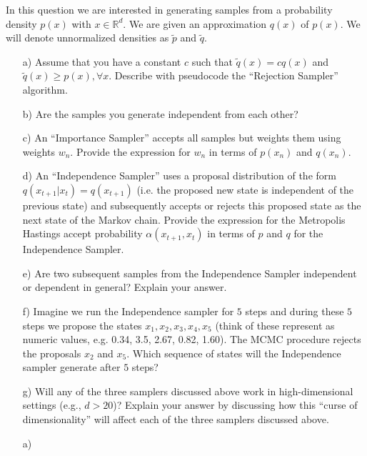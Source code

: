 \documentclass{amsmlaj}
\begin{document}
\begin{problem}
In this question we are interested in generating samples from a probability density $p(x)$ with $x\in\mathbb{R}^d$. We are given an approximation $q(x)$ of $p(x)$. We will denote unnormalized densities as $\tilde{p}$ and $\tilde{q}$. 
\begin{itemize}
\item[a)] Assume that you have a constant $c$ such that $\tilde{q}(x)=c q(x)$ and $\tilde{q}(x)\geq p(x), \forall x$. Describe with pseudocode the ``Rejection Sampler'' algorithm.  
\item[b)] Are the samples you generate independent from each other?
\item[c)] An ``Importance Sampler'' accepts all samples but weights them using weights $w_n$. Provide the expression for $w_n$ in terms of $p(x_n)$ and $q(x_n)$.
\item[d)]  An ``Independence Sampler'' uses a proposal distribution of the form $q(x_{t+1}|x_t) = q(x_{t+1})$ (i.e. the proposed new state is independent of the previous state) and subsequently accepts or rejects this proposed state as the next state of the Markov chain. Provide the expression for the Metropolis Hastings accept probability $\alpha(x_{t+1},x_t)$ in terms of $p$ and $q$ for the Independence Sampler.
\item[e)] Are two subsequent samples from the Independence Sampler independent or dependent in general? Explain your answer.
\item[f)] Imagine we run the Independence sampler for $5$ steps and during these $5$ steps we propose the states $x_1,x_2,x_3,x_4,x_5$ (think of these represent as numeric values, e.g. 0.34, 3.5, 2.67, 0.82, 1.60). The MCMC procedure rejects the proposals $x_2$ and $x_5$. Which sequence of states will the Independence sampler generate after $5$ steps?
\item[g)] Will any of the three samplers discussed above work in high-dimensional settings (e.g., $d>20$)? Explain your answer by discussing how this ``curse of dimensionality'' will affect each of the three samplers discussed above.
\end{itemize}
\newpage
\begin{sol}
	\begin{itemize}
		\item[a)] \hfill\vspace{-1cm}
			\begin{center}

\end{center}
\end{itemize}
\end{sol}
\end{problem}
\end{document}
